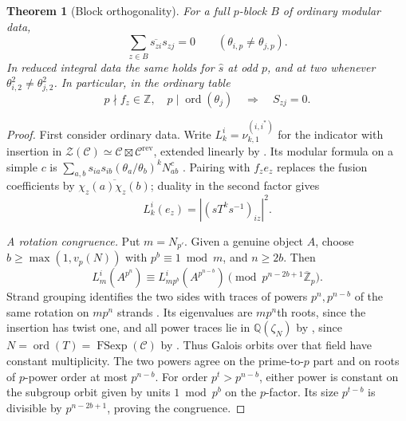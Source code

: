 \documentclass[11pt,a4paper]{article}
\numberwithin{equation}{section}
\newtheorem{theorem}{Theorem}[section]
\theoremstyle{remark}
\newcommand{\C}{\mathcal C}
\newcommand{\Z}{\mathcal Z}
\newcommand{\rev}{\mathrm{rev}}
\newcommand{\ZZ}{\mathbb Z}
\newcommand{\QQ}{\mathbb Q}
\DeclareMathOperator{\ord}{ord}
\begin{document}
\begin{theorem}[Block orthogonality]\label{thm:block}
For a full $p$-block $B$ of ordinary modular data,
\[
 \sum_{z\in B}\overline{s_{zi}}s_{zj}=0
       \qquad(\theta_{i,p}\ne\theta_{j,p}).
\]
In reduced integral data the same holds for $\widehat s$ at odd $p$,
and at two whenever $\theta_{i,2}^2\ne\theta_{j,2}^2$.
In particular, in the ordinary table
\begin{equation}\label{eq:zero}
 p\nmid f_z\in\ZZ,\quad p\mid\ord(\theta_j)
       \quad\Longrightarrow\quad S_{zj}=0 .
\end{equation}
\end{theorem}
\begin{proof}
First consider ordinary data. Write $L_k^i=\nu_{k,1}^{(i,i^*)}$
for the indicator with insertion in
$\Z(\C)\simeq\C\boxtimes\C^{\rev}$, extended linearly by
\cite[Corollary~5.5]{NSind}. Its modular formula on a simple $c$ is
$\sum_{a,b}s_{ia}s_{ib}(\theta_a/\theta_b)^kN_{ab}^c$
\cite[Proposition~6.1]{NSind}. Pairing with $f_ze_z$ replaces the
fusion coefficients by $\overline{\chi_z(a)\chi_z(b)}$;
duality in the second factor gives
\begin{equation}\label{eq:indicator-entry}
 L_k^i(e_z)=|(sT^ks^{-1})_{iz}|^2 .
\end{equation}

\emph{A rotation congruence.}
Put $m=N_{p'}$. Given a genuine object $A$, choose
$b\ge\max(1,v_p(N))$ with $p^b\equiv1\bmod m$, and $n\ge2b$.
Then
\begin{equation}\label{eq:large-power}
 L_m^i(A^{p^n})\equiv L_{mp^b}^i(A^{p^{n-b}})
              \pmod {p^{n-2b+1}\overline{\ZZ}_p}.
\end{equation}
Strand grouping identifies the two sides with traces of powers
$p^n,p^{n-b}$ of the same rotation on $mp^n$ strands
\cite[Lemmas~2.5, 2.7 and Proposition~2.8(ii)]{NSind}. Its
eigenvalues are $mp^n$th roots, since the insertion has twist one,
and all power traces lie in $\QQ(\zeta_N)$
by \cite[Proposition~5.7]{NSind}, since $N=\ord(T)=\operatorname{FSexp}(\C)$ by \cite[Theorem~7.7]{NSfs}. Thus Galois orbits over that field
have constant multiplicity. The two powers agree on the
prime-to-$p$ part and on roots of $p$-power order at most $p^{n-b}$.
For order $p^t>p^{n-b}$, either power is constant on the subgroup
orbit given by units $1\bmod p^b$ on the $p$-factor. Its size
$p^{t-b}$ is divisible by $p^{n-2b+1}$, proving the congruence.


\end{proof}
\end{document}
